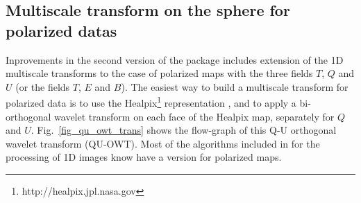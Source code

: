 \subsection{Multiscale transform on the sphere for polarized datas}

Inprovements in the second version of the \mrs package includes extension of the 1D multiscale transforms to the case of polarized maps with 
the three fields $T$, $Q$ and $U$ (or the fields $T$, $E$ and $B$). The easiest way to build a multiscale transform for polarized data is to 
use the Healpix\footnote{http://healpix.jpl.nasa.gov} representation \cite{pixel:healpix}, and to apply a bi-orthogonal wavelet transform 
on each face of the Healpix map, separately for $Q$ and $U$. Fig.~\ref{fig_qu_owt_trans} shows the flow-graph of this Q-U orthogonal wavelet 
transform (QU-OWT). Most of the algorithms included in \mrs for the processing of 1D images know have a version for polarized maps.

